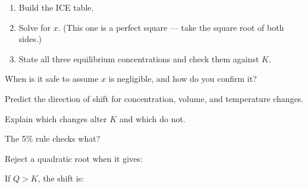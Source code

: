 \documentclass{apchem-notes}
\begin{document}
\begin{enumerate}[leftmargin=*,itemsep=0.4em]
  \item Build the ICE table.
  \item Solve for $x$. (This one is a perfect square --- take the square
        root of both sides.) \workspace[2.6cm]
  \item State all three equilibrium concentrations and check them against
        $K$. \workspace[2.2cm]
\end{enumerate}

\begin{exitticket}
When is it safe to assume $x$ is negligible, and how do you confirm it?
\end{exitticket}


\begin{objectives}
  \item Predict the direction of shift for concentration, volume, and
        temperature changes.
  \item Explain which changes alter $K$ and which do not.
\end{objectives}


\begin{warmup}[3]
  \item The 5\% rule checks what? 
  \item Reject a quadratic root when it gives:
  \item If $Q > K$, the shift is: 
\end{warmup}
\end{document}
